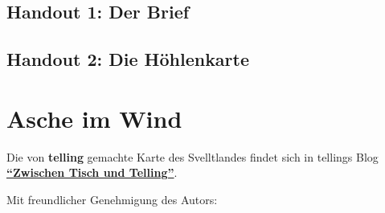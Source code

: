 \documentclass[openright]{Ilaris}
\begin{document}
\subsection[Handouts]{Handout 1: Der Brief}
\label{kuh_ho1}
\bigskip
{}

\vfill

\subsection*{Handout 2: Die Höhlenkarte}
\label{kuh_ho2}

\bigskip
\begin{center}
\end{center}







\section{Asche im Wind}

Die von \textbf{telling} gemachte Karte des Svelltlandes findet sich in tellings Blog \href{https://tellingaventurien.home.blog/2023/02/27/karte-svelltland-um-1045-nach-bosparans-fall/}{\textbf{\enquote{Zwischen Tisch und Telling}}}.

Mit freundlicher Genehmigung des Autors:
\end{document}
